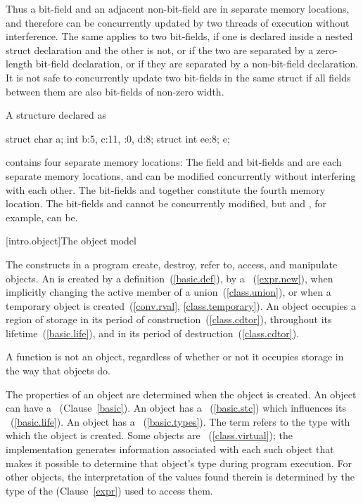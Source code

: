 \pnum
\begin{note} Thus a bit-field and an adjacent non-bit-field are in separate memory
locations, and therefore can be concurrently updated by two threads of execution
without interference. The same applies to two bit-fields, if one is declared
inside a nested struct declaration and the other is not, or if the two are
separated by a zero-length bit-field declaration, or if they are separated by a
non-bit-field declaration. It is not safe to concurrently update two bit-fields
in the same struct if all fields between them are also bit-fields of non-zero
width. \end{note}

\pnum
\begin{example} A structure declared as

\begin{codeblock}
struct {
  char a;
  int b:5,
  c:11,
  :0,
  d:8;
  struct {int ee:8;} e;
}
\end{codeblock}

contains four separate memory locations: The field  and bit-fields
 and  are each separate memory locations, and can be
modified concurrently without interfering with each other. The bit-fields
 and  together constitute the fourth memory location. The
bit-fields  and  cannot be concurrently modified, but
 and , for example, can be. \end{example}%

[intro.object]{The \Cpp object model}

\pnum
{}%
The constructs in a \Cpp program create, destroy, refer to, access, and
manipulate objects.
An  is created
by a definition~(\ref{basic.def}),
by a ~(\ref{expr.new}),
when implicitly changing the active member of a union~(\ref{class.union}),
or
when a temporary object is created~(\ref{conv.rval}, \ref{class.temporary}). 
An object occupies a region of storage
in its period of construction~(\ref{class.cdtor}),
throughout its lifetime~(\ref{basic.life}),
and
in its period of destruction~(\ref{class.cdtor}).
\begin{note} A function is not an object, regardless of whether or not it
occupies storage in the way that objects do. \end{note}
The properties of an
object are determined when the object is created. An object can have a
~(Clause~\ref{basic}). An object has a ~(\ref{basic.stc}) which influences its
~(\ref{basic.life}). An object has a
~(\ref{basic.types}). The term  refers to
the type with which the object is created.
Some objects are
~(\ref{class.virtual}); the implementation
generates information associated with each such object that makes it
possible to determine that object's type during program execution. For
other objects, the interpretation of the values found therein is
determined by the type of the  (Clause~\ref{expr})
used to access them.

